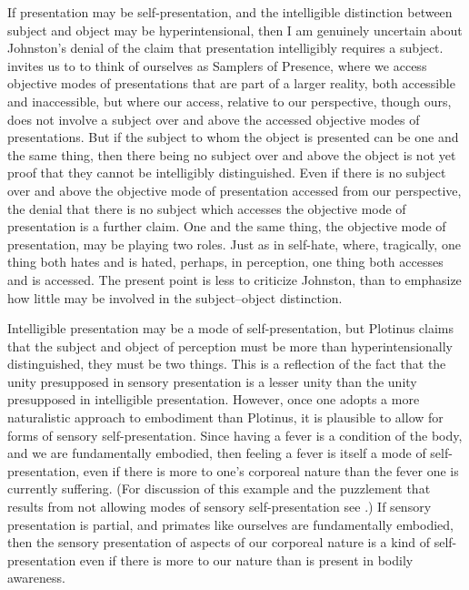 If presentation may be self-presentation, and the intelligible distinction between subject and object may be hyperintensional, then I am genuinely uncertain about Johnston's denial of the claim that presentation intelligibly requires a subject. \citet{Johnston:2007qy} invites us to to think of ourselves as Samplers of Presence, where we access objective modes of presentations that are part of a larger reality, both accessible and inaccessible, but where our access, relative to our perspective, though ours, does not involve a subject over and above the accessed objective modes of presentations. But if the subject to whom the object is presented can be one and the same thing, then there being no subject over and above the object is not yet proof that they cannot be intelligibly distinguished. Even if there is no subject over and above the objective mode of presentation accessed from our perspective, the denial that there is no subject which accesses the objective mode of presentation is a further claim. One and the same thing, the objective mode of presentation, may be playing two roles. Just as in self-hate, where, tragically, one thing both hates and is hated, perhaps, in perception, one thing both accesses and is accessed. The present point is less to criticize Johnston, than to emphasize how little may be involved in the subject--object distinction.

Intelligible presentation may be a mode of self-presentation, but Plotinus claims that the subject and object of perception must be more than hyperintensionally distinguished, they must be two things. This is a reflection of the fact that the unity presupposed in sensory presentation is a lesser unity than the unity presupposed in intelligible presentation. However, once one adopts a more naturalistic approach to embodiment than Plotinus, it is plausible to allow for forms of sensory self-presentation. Since having a fever is a condition of the body, and we are fundamentally embodied, then feeling a fever is itself a mode of self-presentation, even if there is more to one's corporeal nature than the fever one is currently suffering. (For discussion of this example and the puzzlement that results from not allowing modes of sensory self-presentation see \citealt{Yrjonsuuri:2008aa}.) If sensory presentation is partial, and primates like ourselves are fundamentally embodied, then the sensory presentation of aspects of our corporeal nature is a kind of self-presentation even if there is more to our nature than is present in bodily awareness. 

